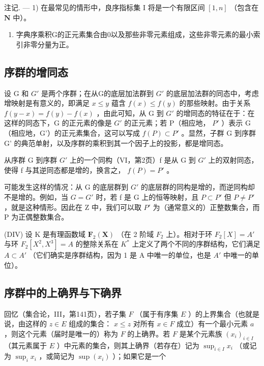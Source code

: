 注记. --- 1) 在最常见的情形中，良序指标集 I 将是一个有限区间 \([1, n]\) （包含在 \(\mathbf{N}\) 中）。

\begin{enumerate}
\def\labelenumi{\arabic{enumi})}
\setcounter{enumi}{1}
\tightlist
\item
  字典序乘积G的正元素集合由0以及那些非零元素组成，这些非零元素的最小索引非零分量为正。
\end{enumerate}

\subsection{序群的增同态}

设 G 和 \(G'\) 是两个序群；在从G的底层加法群到 \(G'\) 的底层加法群的同态中，考虑增映射是有意义的，即满足 \(x \leqslant y\) 蕴含 \(f(x) \leqslant f(y)\) 的那些映射。由于关系 \(f(y - x) = f(y) - f(x)\) ，由此可知，从 G 到 \(G'\) 的增同态的特征在于：在这样的同态下，G 的正元素的像是 \(G'\) 的正元素；若 P（相应地， \(P'\) ）表示 G（相应地，G'）的正元素集合，这可以写成 \(f(P) \subset P'\) 。显然，子群 G 到序群 G' 的典范单射，以及序群的乘积到其一个因子上的投影，都是增同态。

从序群 G 到序群 \(G'\) 上的一个同构（VI，第2页）f 是从 G 到 \(G'\) 上的双射同态，使得 f 与其逆同态都是增的，换言之， \(f(P) = P'\) 。

可能发生这样的情况：从 G 的底层群到 \(G'\) 的底层群的同构是增的，而逆同构却不是增的。例如，当 \(G = G'\) 时，若 f 是 G 上的恒等映射，且 \(P \subset P'\) 但 \(P \neq P'\) ，就是这种情形。因此在 Z 中，我们可以取 \(P'\) 为（通常意义的）正整数集合，而 P 为正偶整数集合。

(DIV) 设 K 是有理函数域 \(\mathbf{F}_{2}(\mathbf{X})\) （在 2 阶域 \(F_{2}\) 上）。相对于环 \(F_{2}[X] = A'\) 与环 \(F_{2}[X^{2}, X^{3}] = A\) 的整除关系在 \(K^{*}\) 上定义了两个不同的序群结构，它们满足 \(A \subset A'\) （它们确实是序群结构，因为 1 是 A 中唯一的单位，也是 \(A'\) 中唯一的单位）。

\subsection{序群中的上确界与下确界}

回忆（集合论，III，第141页），若子集 \(F\) （属于有序集 \(E\) ）的上界集合（也就是说，由这样的 \(z \in E\) 组成的集合： \(x \leqslant z\) 对所有 \(x \in F\) 成立）有一个最小元素 \(a\) ，则这个元素（届时是唯一的）称为 \(F\) 的上确界。若 \(F\) 是某个元素族 \((x_{i})_{i \in I}\) （其元素属于 \(E\) ）中元素的集合，则其上确界（若存在）记为 \(\sup_{i \in I} x_i\) （或记为 \(\sup_{i} x_i\) ，或简记为 \(\sup(x_i)\) ）；如果它是一个

